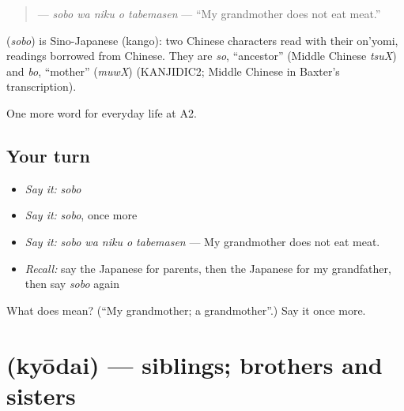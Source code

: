 \begin{quote}
\textbf{  } — \emph{sobo wa niku o tabemasen} — \textquotedblleft{}My grandmother does not eat meat.\textquotedblright{}
\end{quote}

\begin{cousinweb}
\textbf{} (\emph{sobo}) is Sino-Japanese (kango): two Chinese characters read with their on'yomi, readings borrowed from Chinese. They are \emph{so}, \textquotedblleft{}ancestor\textquotedblright{} (Middle Chinese \emph{tsuX}) and \emph{bo}, \textquotedblleft{}mother\textquotedblright{} (\emph{muwX}) (KANJIDIC2; Middle Chinese in Baxter's transcription).
\end{cousinweb}

\begin{grammarlens}[title={What you've built}]
One more word for everyday life at A2.
\end{grammarlens}

\subsection*{Your turn}
\begin{itemize}
\raggedright
  \item \emph{Say it:} \emph{sobo}
  \item \emph{Say it:} \emph{sobo}, once more
  \item \emph{Say it:} \emph{sobo wa niku o tabemasen} — My grandmother does not eat meat.
  \item \emph{Recall:} say the Japanese for parents, then the Japanese for my grandfather, then say \emph{sobo} again
\end{itemize}

\begin{tcolorbox}[breakable,colback=teal!4,colframe=teal!35!black,title={Before you move on}]
What does  mean? (\textquotedblleft{}My grandmother; a grandmother\textquotedblright{}.) Say it once more.
\end{tcolorbox}
\section[\texorpdfstring{\ja{きょうだい} (kyōdai)}{きょうだい (kyōdai)}]{ (kyōdai) — siblings; brothers and sisters}

\label{lesson:JA-C243-kyoudai}



